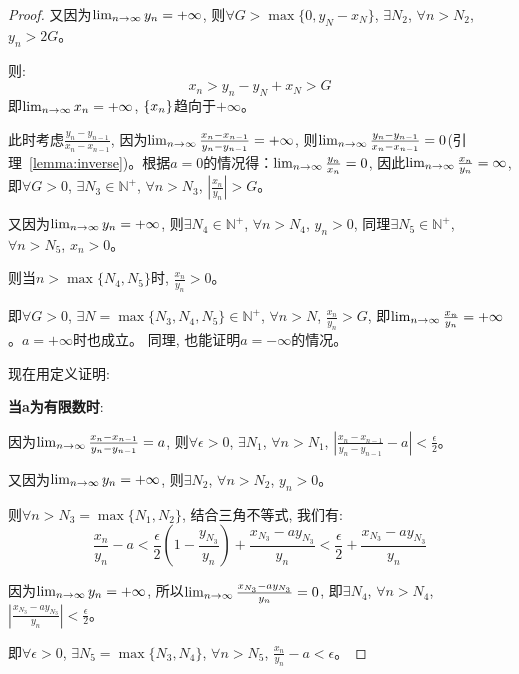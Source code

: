 \begin{proof}
又因为$\lim_{n \to \infty } y_n = +\infty$, 则$\forall G > \max\{0, y_N - x_N\}$, $\exists N_2$, $\forall n > N_2$, $y_n > 2G$。

则:
\begin{equation*}
    x_n > y_n - y_N + x_N > G 
\end{equation*}
即$\lim_{n \to \infty } x_n = +\infty$, $\left\{ x_n\right\}$趋向于$+\infty$。

此时考虑$\frac{y_n - y_{n-1}}{x_n - x_{n-1}}$, 因为$\lim_{n \to \infty } \frac{x_n-x_{n-1}}{y_n - y_{n-1}} = +\infty$, 则$\lim_{n \to \infty } \frac{y_n - y_{n-1}}{x_n-x_{n-1}} = 0$(引理~\ref{lemma:inverse})。根据$a = 0$的情况得：$\lim_{n \to \infty } \frac{y_n}{x_n} = 0$, 因此$\lim_{n \to \infty } \frac{x_n}{y_n} = \infty$, 即$\forall G > 0$, $\exists N_3 \in \mathbb{N}^+$, $\forall n > N_3$, $\left| \frac{x_n}{y_n} \right| > G$。

又因为$\lim_{n \to \infty } y_n = +\infty$, 则$\exists N_4 \in \mathbb{N}^+$, $\forall n > N_4$, $y_n > 0$, 同理$\exists N_5 \in \mathbb{N}^+$, $\forall n > N_5$, $x_n > 0$。

则当$n > \max\{ N_4, N_5 \}$时, $\frac{x_n}{y_n} > 0$。

即$\forall G > 0$, $\exists N = \max\{ N_3, N_4, N_5 \} \in \mathbb{N}^+$, $\forall n > N$, $\frac{x_n}{y_n} > G$, 即$\lim_{n \to \infty } \frac{x_n}{y_n} = +\infty$。$a = +\infty$时也成立。
同理, 也能证明$a = -\infty$的情况。


现在用定义证明:

{\bf 当a为有限数时}:

因为$\lim_{n \to \infty } \frac{x_n-x_{n-1}}{y_n-y_{n-1}} = a$, 则$\forall \epsilon > 0$, $\exists N_1$, $\forall n > N_1$, $\left| \frac{x_n - x_{n-1}}{y_n - y_{n-1}} - a\right| < \frac{\epsilon}{2}$。

又因为$\lim_{n \to \infty } y_n = +\infty$, 则$\exists N_2$, $\forall n > N_2$, $y_n > 0$。

则$\forall n > N_3 = \max\{N_1, N_2\}$, 结合三角不等式, 我们有:
\begin{equation*}
    \frac{x_n}{y_n}-a < \frac{\epsilon}{2}\left(1 - \frac{y_{N_3}}{y_n}\right) + \frac{x_{N_3}-ay_{N_3}}{y_n} < \frac{\epsilon}{2} + \frac{x_{N_3}-ay_{N_3}}{y_n} 
\end{equation*}

因为$\lim_{n \to \infty } y_n = +\infty$, 所以$\lim_{n \to \infty } \frac{x_{N_3}-ay_{N_3}}{y_n} = 0$, 即$\exists N_4$, $\forall n > N_4$, $\left| \frac{x_{N_3}-ay_{N_3}}{y_n} \right| < \frac{\epsilon}{2}$。

即$\forall \epsilon > 0$, $\exists N_5 = \max\{N_3, N_4\}$, $\forall n > N_5$, $\frac{x_n}{y_n} - a < \epsilon$。


\end{proof}
